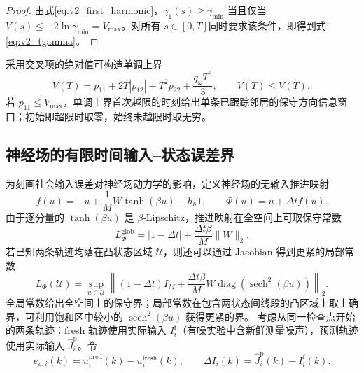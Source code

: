 \documentclass[UTF8,fontset=windows,11pt]{ctexart}
\begin{document}
\begin{proof}
由式\eqref{eq:v2_first_harmonic}，$\gamma_1(s)\ge\gamma_{\min}$ 当且仅当 $V(s)\le-2\ln\gamma_{\min}=V_{\max}$。对所有 $s\in[0,T]$同时要求该条件，即得到式\eqref{eq:v2_tgamma}。
\end{proof}

采用交叉项的绝对值可构造单调上界
\begin{equation}
 \overline V(T)=p_{11}+2T|p_{12}|+T^2p_{22}+\frac{q_\omega T^3}{3},
 \qquad V(T)\le\overline V(T),
 \label{eq:v2_vupper}
\end{equation}
若 $p_{11}\le V_{\max}$，单调上界首次越限的时刻给出单条已跟踪邻居的保守方向信息窗口；初始即超限时取零，始终未越限时取无穷。

\subsection{神经场的有限时间输入--状态误差界}

为刻画社会输入误差对神经场动力学的影响，定义神经场的无输入推进映射
\begin{equation}
 f(u)=-u+\frac{1}{M}W\tanh(\beta u)-h_b\bm 1,
 \qquad
 \Phi(u)=u+\Delta t f(u).
 \label{eq:v2_field_map}
\end{equation}
由于逐分量的 $\tanh(\beta u)$ 是 $\beta$-Lipschitz，推进映射在全空间上可取保守常数
\begin{equation}
 L_\Phi^{\mathrm{glob}}
 =|1-\Delta t|+\frac{\Delta t\beta}{M}\|W\|_2.
 \label{eq:v2_global_lipschitz}
\end{equation}
若已知两条轨迹均落在凸状态区域 $\mathcal U$，则还可以通过 Jacobian 得到更紧的局部常数
\begin{equation}
 L_\Phi(\mathcal U)=
 \sup_{u\in\mathcal U}
 \left\|(1-\Delta t)I_M+
 \frac{\Delta t\beta}{M}W
 \operatorname{diag}\!\left(\operatorname{sech}^2(\beta u)\right)
 \right\|_2.
 \label{eq:v2_local_lipschitz}
\end{equation}
全局常数给出全空间上的保守界；局部常数在包含两状态间线段的凸区域上取上确界，可利用饱和区中较小的 $\operatorname{sech}^2(\beta u)$ 获得更紧的界。
考虑从同一检查点开始的两条轨迹：fresh 轨迹使用实际输入 $I_i^{\mathrm f}$（有噪实验中含新鲜测量噪声），预测轨迹使用实际输入 $\widehat J_i^{\mathrm p}$。令
\begin{equation}
 e_{u,i}(k)=u_i^{\mathrm{pred}}(k)-u_i^{\mathrm{fresh}}(k),
 \qquad
 \Delta I_i(k)=\widehat J_i^{\mathrm p}(k)-I_i^{\mathrm f}(k).
 \label{eq:v2_state_error}
\end{equation}
\end{document}
